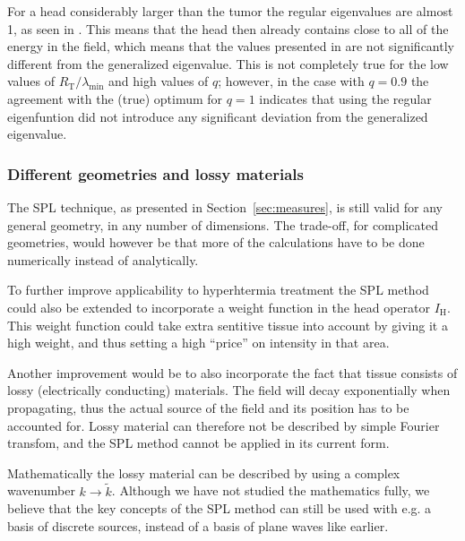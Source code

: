 \documentclass[11pt,a4paper, 
swedish,english %
]{article}
\newcommand{\RT}{\ensuremath{R_{\text{T}}}}
\begin{document}
For a head considerably larger than the tumor the
regular eigenvalues are almost 1, as seen in . This
means that the head then already contains close to all of the energy
in the field, which means that the values presented in
 are not significantly different from the generalized
eigenvalue. 
This is not completely true for the low values of
$\RT/\lambda_{\min}$ and high values of $q$; however, in the case with
$q=0.9$ the agreement with the (true) optimum for $q=1$ indicates that
using the regular eigenfuntion did not introduce any significant
deviation from the generalized eigenvalue.


\subsubsection{Different geometries and lossy materials}
The SPL technique, as presented in Section~\ref{sec:measures}, is
still valid for any general geometry, in any number of dimensions.
The trade-off, for complicated geometries, would however be that more
of the calculations have to be done numerically instead of analytically. 

To further improve applicability to hyperhtermia treatment the SPL
method could also be extended to incorporate a weight function in the
head operator $I_\text{H}$. This weight function could take extra
sentitive tissue into account by giving it a high weight, and thus
setting a high ``price'' on intensity in that area. 

Another improvement would be to also incorporate the fact that tissue
consists of lossy (electrically conducting) materials. 
The field will decay exponentially when propagating, thus the
actual source of the field and its position has to be accounted
for. Lossy material can therefore not be described by simple 
Fourier transfom, and the SPL method cannot be applied in its current
form. 

Mathematically the lossy material can be described by using a complex
wavenumber $k\to\tilde{k}$. Although we have not studied the mathematics 
fully, we believe that the key concepts of the SPL method can
still be used with e.g. a basis of discrete sources, instead of a
basis of plane waves like earlier. 

\end{document}
